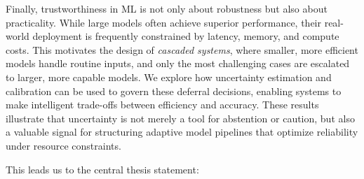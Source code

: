 Finally, trustworthiness in ML is not only about robustness but also about practicality. While large models often achieve superior performance, their real-world deployment is frequently constrained by latency, memory, and compute costs. This motivates the design of \emph{cascaded systems}, where smaller, more efficient models handle routine inputs, and only the most challenging cases are escalated to larger, more capable models. We explore how uncertainty estimation and calibration can be used to govern these deferral decisions, enabling systems to make intelligent trade-offs between efficiency and accuracy. These results illustrate that uncertainty is not merely a tool for abstention or caution, but also a valuable signal for structuring adaptive model pipelines that optimize reliability under resource constraints.

This leads us to the central thesis statement:





